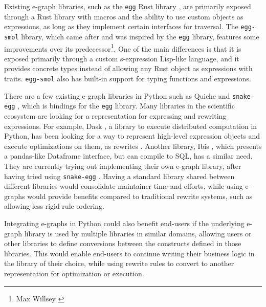 \documentclass[sigplan,screen,review]{acmart}
\begin{document}
Existing e-graph libraries, such as the \verb|egg| Rust library \cite{Willsey2020eggFA}, are primarily exposed through a Rust library with macros and the ability to use custom objects as expressions, as long as they implement certain interfaces for traversal. The \verb|egg-smol| library, which came after and was inspired by the \verb|egg| library, features some improvements over its predecessor\footnote{ Max Willsey \cite{zulip}}. One of the main differences is that it is exposed primarily through a custom s-expression Lisp-like language, and it provides concrete types instead of allowing any Rust object as expressions with traits. \verb|egg-smol| also has built-in support for typing functions and expressions.

There are a few existing e-graph libraries in Python such as Quiche \cite{quiche} and \verb|snake-egg| \cite{snake}, which is bindings for the \verb|egg| library. Many libraries in the scientific ecosystem are looking for a representation for expressing and rewriting expressions. For example, Dask \cite{matthew_rocklin-proc-scipy-2015}, a library to execute distributed computation in Python, has been looking for a way to represent high-level expression objects and execute optimizations on them, as rewrites \cite{dask-graphs}. Another library, Ibis \cite{ibis}, which presents a pandas-like Dataframe interface, but can compile to SQL, has a similar need. They are currently trying out implementing their own e-graph library, after having tried using \verb|snake-egg| \cite{ibis-egraph}. Having a standard library shared between different libraries would consolidate maintainer time and efforts, while using e-graphs would provide benefits compared to traditional rewrite systems, such as allowing less rigid rule ordering.

Integrating e-graphs in Python could also benefit end-users if the underlying e-graph library is used by multiple libraries in similar domains, allowing users or other libraries to define conversions between the constructs defined in those libraries. This would enable end-users to continue writing their business logic in the library of their choice, while using rewrite rules to convert to another representation for optimization or execution.
\end{document}
